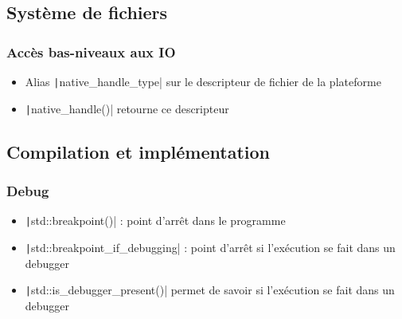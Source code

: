 \documentclass[C++.tex]{subfiles}
\begin{document}
\subsection*{Système de fichiers}
\begin{frame}[fragile]
	\frametitle{Accès bas-niveaux aux IO}
	\begin{itemize}
		\item Alias \texttt|native_handle_type| sur le descripteur de fichier de la plateforme
		\item \texttt|native_handle()| retourne ce descripteur
	\end{itemize}

\end{frame}

\subsection*{Compilation et implémentation}
\begin{frame}[fragile]
	\frametitle{Debug}
	\begin{itemize}
		\item \texttt|std::breakpoint()| : point d'arrêt dans le programme
		\item \texttt|std::breakpoint_if_debugging| : point d'arrêt si l'exécution se fait dans un debugger
		\item \texttt|std::is_debugger_present()| permet de savoir si l'exécution se fait dans un debugger
	\end{itemize}

\end{frame}
\end{document}
